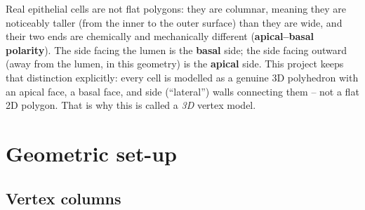 \documentclass[11pt,a4paper]{report}
\begin{document}
\begin{center}
\label{fig:cross-section-cartoon}
\end{center}

Real epithelial cells are not flat polygons: they are columnar, meaning
they are noticeably taller (from the inner to the outer surface) than
they are wide, and their two ends are chemically and mechanically
different (\textbf{apical--basal polarity}). The side facing the lumen
is the \textbf{basal} side; the side facing outward (away from the
lumen, in this geometry) is the \textbf{apical} side. This project
keeps that distinction explicitly: every cell is modelled as a genuine
3D polyhedron with an apical face, a basal face, and side (``lateral'')
walls connecting them -- not a flat 2D polygon. That is why this is
called a \emph{3D} vertex model.

\section{Geometric set-up}
\label{sec:geom-setup}

\subsection{Vertex columns}
\end{document}
